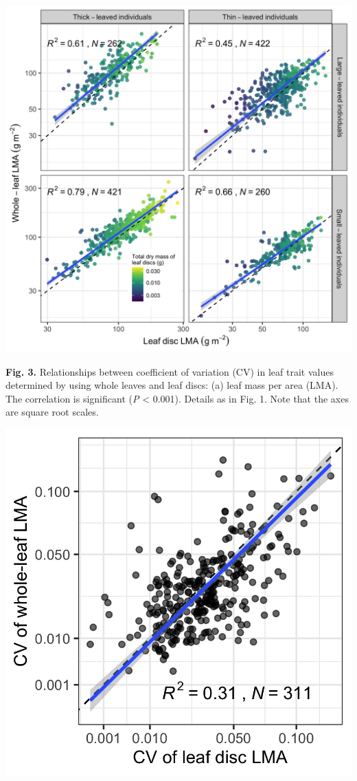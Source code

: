 \documentclass[
  12pt,
  a4paper,
,tablecaptionabove
]{scrartcl}
\begin{document}
\includegraphics{../figs/LMA_ind_gr.png}

\newpage

\textbf{Fig. 3.} Relationships between coefficient of variation (CV) in
leaf trait values determined by using whole leaves and leaf discs: (a)
leaf mass per area (LMA). The correlation is significant (\emph{P}
\textless{} 0.001). Details as in Fig. 1. Note that the axes are square
root scales.

\includegraphics{../figs/fig_cv.png}
\end{document}
